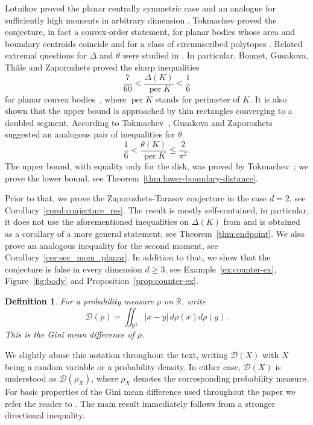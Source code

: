 \documentclass[final,12pt]{elsarticle}
\numberwithin{equation}{section}
\newtheorem{defi}[thm]{Definition}
\theoremstyle{remark}
\newcommand{\R}{\mathbb R}
\newcommand{\Gini}{\mathcal D}
\theoremstyle{definition}
\begin{document}
Lotnikov proved the planar centrally symmetric case and an analogue for sufficiently high moments in arbitrary dimension \cite{Lotnikov}. Tokmachev proved the conjecture, in fact a convex-order statement, for planar bodies whose area and boundary centroids coincide and for a class of circumscribed polytopes \cite{Tokmachev2026}. Related extremal questions for $\Delta$ and $\theta$ were studied in \cite{BonnetEtAl,TokmachevBoundary}.
In particular, Bonnet, Gusakova, Th\"ale and Zaporozhets proved the sharp inequalities
$$
    \frac{7}{60}
    <
    \frac{\Delta(K)}{\operatorname{per} K}
    <
    \frac{1}{6}
$$
for planar convex bodies~\cite{BonnetEtAl}, where $\operatorname{per} K$ stands for perimeter of $K$.  It is also shown that the upper bound is approached by thin rectangles converging to a doubled segment.
According to Tokmachev~\cite[Eq.~(5)]{Tokmachev2026},
Gusakova and Zaporozhets suggested an analogous pair of inequalities for $\theta$
$$
    \frac{1}{6}
    <
    \frac{\theta(K)}{\operatorname{per} K}
    \leq
    \frac{2}{\pi^2}.$$
The upper bound, with equality only for the disk, was proved by
Tokmachev~\cite{TokmachevBoundary}; we prove the lower bound, see Theorem~\ref{thm:lower-boundary-distance}.
\par Prior to that, we prove the Zaporozhets-Tarasov conjecture in the case $d=2$, see Corollary~\ref{corol:conjecture_res}. The result is mostly self-contained, in particular, it does not use the aforementioned inequalities on $\Delta(K)$ from \cite{BonnetEtAl} and is obtained as a corollary of a more general statement, see Theorem~\ref{thm:endpoint}. We also prove an analogous inequality for the second moment, see Corollary~\ref{cor:sec_mom_planar}. In addition to that, we show that the conjecture is false in every dimension $d\geq3$, see Example~\ref{ex:counter-ex}, Figure~\ref{fig:body} and Proposition~\ref{prop:counter-ex}.

\begin{defi}
    For a probability measure $\rho$ on $\R$, write
$$
 \Gini(\rho)=\iint_{\R^2}|x-y|\,d\rho(x)d\rho(y).
$$
This is the \textit{Gini mean difference} of $\rho$.
\end{defi}
We slightly abuse this notation throughout the text, writing $\Gini(X)$ with $X$ being a random variable or a probability density. In either case, $\Gini(X)$ is understood as $\Gini(\rho_X)$, where $\rho_X$ denotes the corresponding probability measure. For basic properties of the Gini mean difference used throughout the paper we refer the reader to \cite{Yitzhaki}.
The main result immediately follows from a stronger directional inequality.
\end{document}
